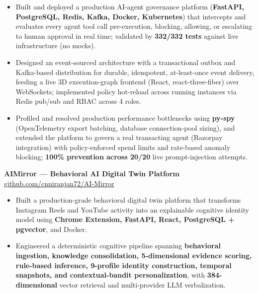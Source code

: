 \documentclass[a4paper,11pt]{article}
\begin{document}
\begin{itemize}

\item Built and deployed a production AI-agent governance platform (\textbf{FastAPI, PostgreSQL, Redis, Kafka, Docker, Kubernetes}) that intercepts and evaluates every agent tool call pre-execution, blocking, allowing, or escalating to human approval in real time; validated by \textbf{332/332 tests} against live infrastructure (no mocks).

\item Designed an event-sourced architecture with a transactional outbox and Kafka-based distribution for durable, idempotent, at-least-once event delivery, feeding a live 3D execution-graph frontend (React, react-three-fiber) over WebSockets; implemented policy hot-reload across running instances via Redis pub/sub and RBAC across 4 roles.

\item Profiled and resolved production performance bottlenecks using \textbf{py-spy} (OpenTelemetry export batching, database connection-pool sizing), and extended the platform to govern a real transacting agent (Razorpay integration) with policy-enforced spend limits and rate-based anomaly blocking; \textbf{100\% prevention across 20/20} live prompt-injection attempts.

\end{itemize}

\vspace{1pt}

\textbf{AIMirror — Behavioral AI Digital Twin Platform}
\hfill
\href{https://github.com/cnniranjan72/AI-Mirror}{github.com/cnniranjan72/AI-Mirror}

\begin{itemize}

\item Built a production-grade behavioral digital twin platform that transforms Instagram Reels and YouTube activity into an explainable cognitive identity model using \textbf{Chrome Extension, FastAPI, React, PostgreSQL + pgvector}, and Docker.

\item Engineered a deterministic cognitive pipeline spanning \textbf{behavioral ingestion, knowledge consolidation, 5-dimensional evidence scoring, rule-based inference, 9-profile identity construction, temporal snapshots, and contextual-bandit personalization}, with \textbf{384-dimensional} vector retrieval and multi-provider LLM verbalization.

\end{itemize}
\end{document}
